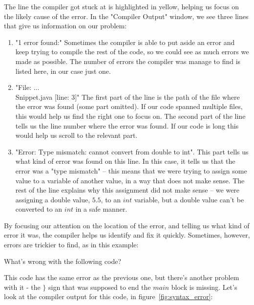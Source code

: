 The line the compiler got stuck at is highlighted in yellow, helping us focus on the likely cause of the error. In the "Compiler Output" window, we see three lines that give us information on our problem:

\begin{enumerate}
    \item "1 error found:"
    Sometimes the compiler is able to put aside an error and keep trying to compile the rest of the code, so we could see as much errors we made as possible. The number of errors the compiler was manage to find is listed here, in our case just one.
    \item "File: ...\\Snippet.java [line: 3]" 
    The first part of the line is the path of the file where the error was found (some part omitted). If our code spanned multiple files, this would help us find the right one to focus on.
    The second part of the line tells us the line number where the error was found. If our code is long this would help us scroll to the relevant part.
    \item "Error: Type mismatch: cannot convert from double to int".
    This part tells us what kind of error was found on this line. In this case, it tells us that the error was a "type mismatch" -- this means that we were trying to assign some value to a variable of another value, in a way that does not make sense. The rest of the line explains why this assignment did not make sense -- we were assigning a double value, $5.5$, to an $int$ variable, but a double value can't be converted to an $int$ in a safe manner.
\end{enumerate}

By focusing our attention on the location of the error, and telling us what kind of error it was, the compiler helps us identify and fix it quickly. Sometimes, however, errors are trickier to find, as in this example:

\begin{example}
What's wrong with the following code?

\begin{code}
public class Snippet{
    public static void main(String []args){
        int x = 5.5;
    
}
\end{code}
\end{example}

This code has the same error as the previous one, but there's another problem with it - the $\}$ sign that was supposed to end the $main$ block is missing. Let's look at the compiler output for this code, in figure~\ref{fig:syntax_error}:

